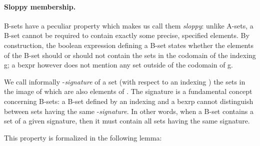 

  

\paragraph{Sloppy membership.}
B-sets have a peculiar property which makes us call them \emph{sloppy}: unlike A-sets, a B-set cannot be required to contain exactly some precise, specified elements. By construction, the boolean expression defining a B-set states whether the elements of the B-set should or should not contain the sets in the codomain of the indexing g; a bexpr however does not mention any set outside of the codomain of g.

We call informally -\emph{signature} of a set  (with respect to an indexing ) the sets in the image of  which are also elements of . The signature is a fundamental concept concerning B-sets: a B-set defined by an indexing  and a bexrp  cannot distinguish between sets having the same -\emph{signature}. In other words, when a B-set contains a set of a given signature, then it must contain all sets having the same signature.

This property is formalized in the following lemma:
   

